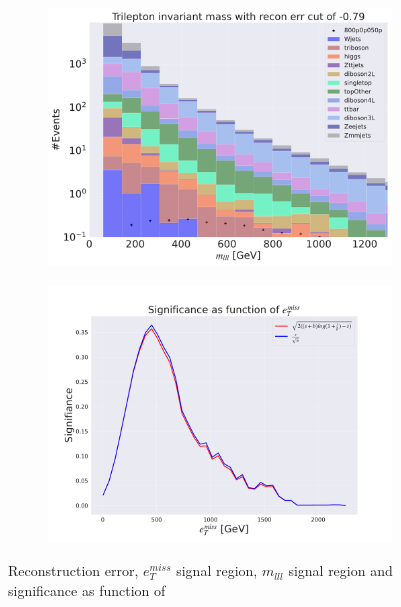 \begin{figure}[H]
    \hfill
    \begin{subfigure}{.40\textwidth}
        \includegraphics[width=\textwidth]{Figures/VAE_testing/big/3lep/b_data_recon_big_rm3_feats_sig_800p0p050p_mlll_recon_errcut_-0.79.pdf}
        \caption{}
        \label{fig:VAE_3lep_big_mlll_800_2}
    \end{subfigure}
    \hfill   
    \begin{subfigure}{.40\textwidth}
        \includegraphics[width=\textwidth]{Figures/VAE_testing/big/3lep/significance_etmiss_800p0p050p_-0.7941392653620614.pdf}
        \caption{}
        \label{fig:VAE_3lep_big_signi_800_2}
    \end{subfigure}
    \hfill      
    \caption[3lep deep network | $800p50$ | VAE | 2]{Reconstruction error, $e_T^{miss}$ signal region, $m_{lll}$ signal region and significance as function of 
}
\end{figure}
